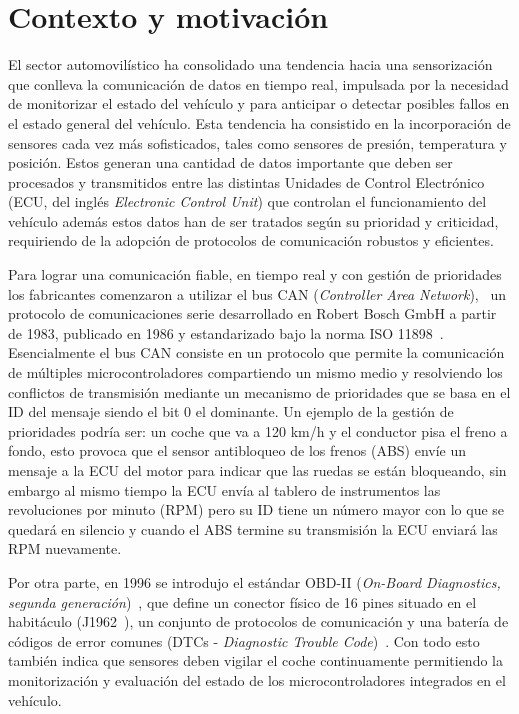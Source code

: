 \section{Contexto y motivación}

El sector automovilístico ha consolidado una tendencia hacia una sensorización que conlleva la comunicación de datos en tiempo real, impulsada por la necesidad de monitorizar el estado del vehículo y para anticipar o detectar posibles fallos en el estado general del vehículo. Esta tendencia ha consistido en la incorporación de sensores cada vez más sofisticados, tales como sensores de presión, temperatura y posición. Estos generan una cantidad de datos importante que deben ser procesados y transmitidos entre las distintas Unidades de Control Electrónico (ECU, del inglés \textit{Electronic Control Unit}) que controlan el funcionamiento del vehículo además estos datos han de ser tratados según su prioridad y criticidad, requiriendo de la adopción de protocolos de comunicación robustos y eficientes.

Para lograr una comunicación fiable, en tiempo real y con gestión de prioridades los fabricantes comenzaron a utilizar el bus CAN (\textit{Controller Area Network}),~\cite{CiA_CANhistory} un protocolo de comunicaciones serie desarrollado en Robert Bosch GmbH a partir de 1983, publicado en 1986 y estandarizado bajo la norma ISO 11898~\cite{ISO11898:1993, CiA_CANhistory}. Esencialmente el bus CAN consiste en un protocolo que permite la comunicación de múltiples microcontroladores compartiendo un mismo medio y resolviendo los conflictos de transmisión mediante un mecanismo de prioridades que se basa en el ID del mensaje siendo el bit 0 el dominante. Un ejemplo de la gestión de prioridades podría ser: un coche que va a 120 km/h y el conductor pisa el freno a fondo, esto provoca que el sensor antibloqueo de los frenos (ABS) envíe un mensaje a la ECU del motor para indicar que las ruedas se están bloqueando, sin embargo al mismo tiempo la ECU envía al tablero de instrumentos las revoluciones por minuto (RPM) pero su ID tiene un número mayor con lo que se quedará en silencio y cuando el ABS termine su transmisión la ECU enviará las RPM nuevamente.

Por otra parte, en 1996 se introdujo el estándar OBD-II (\textit{On-Board Diagnostics, segunda generación})~\cite{CARB_OBDII, EPA_OBD}, que define un conector físico de 16 pines situado en el habitáculo (J1962~\cite{SAEJ2012:2016}), un conjunto de protocolos de comunicación y una batería de códigos de error comunes (DTCs - \textit{Diagnostic Trouble Code})~\cite{SAEJ2012:2016}. Con todo esto también indica que sensores deben vigilar el coche continuamente permitiendo la monitorización y evaluación del estado de los microcontroladores integrados en el vehículo.

